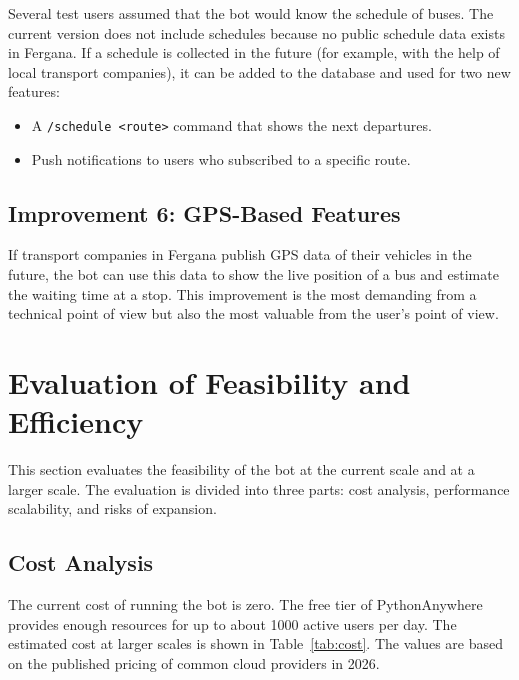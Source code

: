 Several test users assumed that the bot would know the schedule of buses.
The current version does not include schedules because no public schedule
data exists in Fergana. If a schedule is collected in the future (for
example, with the help of local transport companies), it can be added to
the database and used for two new features:

\begin{itemize}
    \item A \texttt{/schedule <route>} command that shows the next
        departures.
    \item Push notifications to users who subscribed to a specific route.
\end{itemize}

\subsection{Improvement 6: GPS-Based Features}
\label{subsec:gps}

If transport companies in Fergana publish GPS data of their vehicles in
the future, the bot can use this data to show the live position of a bus
and estimate the waiting time at a stop. This improvement is the most
demanding from a technical point of view but also the most valuable from
the user's point of view.

\section{Evaluation of Feasibility and Efficiency}
\label{sec:feasibility}

This section evaluates the feasibility of the bot at the current scale and
at a larger scale. The evaluation is divided into three parts: cost
analysis, performance scalability, and risks of expansion.

\subsection{Cost Analysis}
\label{subsec:cost}

The current cost of running the bot is zero. The free tier of
PythonAnywhere provides enough resources for up to about 1000 active users
per day. The estimated cost at larger scales is shown in
Table~\ref{tab:cost}. The values are based on the published pricing of
common cloud providers in 2026.

